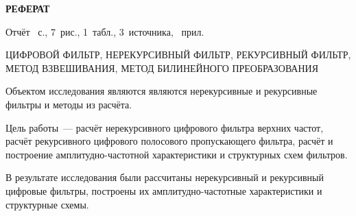 \begin{center}
  \Large{\textbf{РЕФЕРАТ}}
\end{center}

Отчёт ~с., 7~рис., 1~табл., 3~источника,
~прил.


ЦИФРОВОЙ ФИЛЬТР, НЕРЕКУРСИВНЫЙ ФИЛЬТР, РЕКУРСИВНЫЙ ФИЛЬТР, МЕТОД
ВЗВЕШИВАНИЯ, МЕТОД БИЛИНЕЙНОГО ПРЕОБРАЗОВАНИЯ

Объектом исследования являются являются нерекурсивные и рекурсивные
фильтры и методы из расчёта.

Цель работы~--- расчёт нерекурсивного цифрового фильтра верхних
частот, расчёт рекурсивного цифрового полосового пропускающего
фильтра, расчёт и построение амплитудно-частотной характеристики
и структурных схем фильтров.

В результате исследования были рассчитаны нерекурсивный и рекурсивный
цифровые фильтры, построены их амплитудно-частотные характеристики и
структурные схемы.

\newpage



